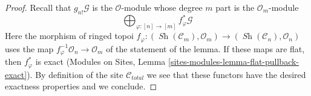 \documentclass{stacks-project}
\theoremstyle{plain}
\theoremstyle{definition}
\theoremstyle{remark}
\numberwithin{equation}{subsection}
\def\Sh{\mathop{\mathit{Sh}}\nolimits}
\begin{document}
\begin{proof}
Recall that $g_{n!}\mathcal{G}$ is the $\mathcal{O}$-module
whose degree $m$ part is the $\mathcal{O}_m$-module
$$
\bigoplus\nolimits_{\varphi : [n] \to [m]} f_\varphi^*\mathcal{G}
$$
Here the morphism of ringed topoi
$f_\varphi : (\Sh(\mathcal{C}_m), \mathcal{O}_m) \to
(\Sh(\mathcal{C}_n), \mathcal{O}_n)$ uses the map
$f_\varphi^{-1}\mathcal{O}_n \to \mathcal{O}_m$ of the
statement of the lemma. If these maps are flat, then
$f_\varphi^*$ is exact
(Modules on Sites, Lemma \ref{sites-modules-lemma-flat-pullback-exact}).
By definition of the site $\mathcal{C}_{total}$ we see that these
functors have the desired exactness properties and we conclude.
\end{proof}
\end{document}
